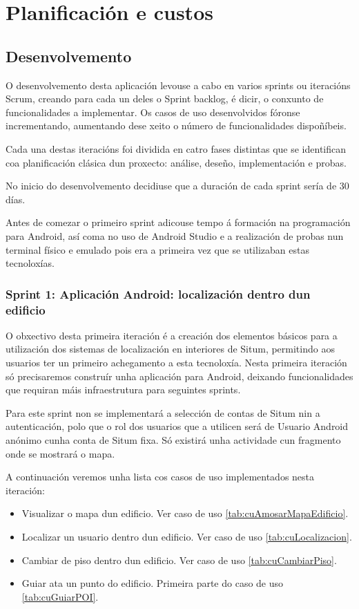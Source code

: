 \chapter{Planificación e custos}

\section{Desenvolvemento}
O desenvolvemento desta aplicación levouse a cabo en varios sprints ou iteracións Scrum, creando para cada un deles o Sprint backlog, é dicir, o conxunto de funcionalidades a implementar. Os casos de uso desenvolvidos fóronse incrementando, aumentando dese xeito o número de funcionalidades dispoñíbeis.

Cada una destas iteracións foi dividida en catro fases distintas que se identifican coa planificación clásica dun proxecto: análise, deseño, implementación e probas.

No inicio do desenvolvemento decidiuse que a duración de cada sprint sería de 30 días.

Antes de comezar o primeiro sprint adicouse tempo á formación na programación para Android, así coma no uso de Android Studio e a realización de probas nun terminal físico e emulado pois era a primeira vez que se utilizaban estas tecnoloxías.

\subsection{Sprint 1: Aplicación Android: localización dentro dun edificio}
O obxectivo desta primeira iteración é a creación dos elementos básicos para a utilización dos sistemas de localización en interiores de Situm, permitindo aos usuarios ter un primeiro achegamento a esta tecnoloxía. Nesta primeira iteración só precisaremos construír unha aplicación para Android, deixando funcionalidades que requiran máis infraestrutura para seguintes sprints.

Para este sprint non se implementará a selección de contas de Situm nin a autenticación, polo que o rol dos usuarios que a utilicen será de Usuario Android anónimo cunha conta de Situm fixa. Só existirá unha actividade cun fragmento onde se mostrará o mapa.

A continuación veremos unha lista cos casos de uso implementados nesta iteración:

\begin{itemize}
	\item Visualizar o mapa dun edificio. Ver caso de uso \ref{tab:cuAmosarMapaEdificio}.
	\item Localizar un usuario dentro dun edificio. Ver caso de uso \ref{tab:cuLocalizacion}.
	\item Cambiar de piso dentro dun edificio. Ver caso de uso \ref{tab:cuCambiarPiso}.
	\item Guiar ata un punto do edificio. Primeira parte do caso de uso \ref{tab:cuGuiarPOI}.
\end{itemize}

